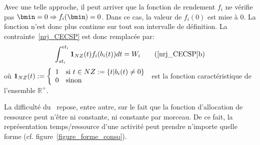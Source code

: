 Avec une telle approche, il peut arriver que la fonction de rendement
$f_i$ ne vérifie pas $\bmin=0 \Rightarrow f_i(\bmin)=0$. Dans ce cas,
la valeur de $f_i(0)$ est mise à $0$. La fonction n'est donc plus
continue sur tout son intervalle de définition. La
contrainte~\eqref{nrj_CECSP} est donc remplacée par:
\begin{equation}
  \int_{st_i}^{et_i}{\bf 1}_{NZ}(t)f_i(b_i(t))dt = W_i \tag{\ref{nrj_CECSP}b}
\end{equation}
\noindent 
où ${\bf 1}_{NZ}(t):=\left\{
  \begin{array}{ll}
    1 & \text{si }t \in NZ:=\{t|b_i(t)\neq0\}\\
    0 & \text{sinon}
  \end{array}
\right.$ est la fonction caractéristique de l'ensemble $\mathbb{R}^+$.

La difficulté du \CECSP~repose, entre autre, sur le fait que la
fonction d'allocation de ressource peut n'être ni constante, ni
constante par morceau. De ce fait, la représentation temps/ressource
d'une activité peut prendre n'importe quelle forme
(cf. figure~\ref{figure_forme_conso}). 

